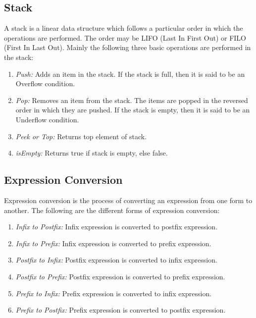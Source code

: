 \documentclass[11pt]{article}
\begin{document}
\subsection{Stack}
A stack is a linear data structure which follows a particular order in which the operations are
performed. The order may be LIFO (Last In First Out) or FILO (First In Last Out). Mainly the
following three basic operations are performed in the stack:
\begin{enumerate}
	\item \textit{Push:} Adds an item in the stack. If the stack is full, then it is said to be an
	      Overflow condition.
	\item \textit{Pop:} Removes an item from the stack. The items are popped in the reversed order
	      in which they are pushed. If the stack is empty, then it is said to be an Underflow
	      condition.
	\item \textit{Peek or Top:} Returns top element of stack.
	\item \textit{isEmpty:} Returns true if stack is empty, else false.
\end{enumerate}


\subsection{Expression Conversion}
Expression conversion is the process of converting an expression from one form to another. The
following are the different forms of expression conversion:
\begin{enumerate}
	\item \textit{Infix to Postfix:} Infix expression is converted to postfix expression.
	\item \textit{Infix to Prefix:} Infix expression is converted to prefix expression.
	\item \textit{Postfix to Infix:} Postfix expression is converted to infix expression.
	\item \textit{Postfix to Prefix:} Postfix expression is converted to prefix expression.
	\item \textit{Prefix to Infix:} Prefix expression is converted to infix expression.
	\item \textit{Prefix to Postfix:} Prefix expression is converted to postfix expression.
\end{enumerate}
\end{document}
